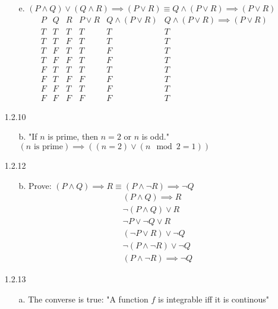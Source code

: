 \documentclass[11pt]{amsart}
\theoremstyle{definition}
\begin{document}
\begin{itemize}
\begin{itemize}
    \item[e.] $(P\land Q)\lor(Q\land R)\implies (P\lor R)\equiv
                Q\land(P\lor R)\implies (P\lor R)$
    \begin{equation*}
    \begin{array}{cccccc}
        P & Q & R & P\lor R & Q\land (P\lor R) & Q\land(P\lor R)\implies (P\lor R) \\
        T & T & T & T & T & T \\
        T & T & F & T & T & T \\
        T & F & T & T & F & T \\
        T & F & F & T & F & T \\
        F & T & T & T & T & T \\
        F & T & F & F & F & T \\
        F & F & T & T & F & T \\
        F & F & F & F & F & T
    \end{array}
    \end{equation*}  
    
\end{itemize}

\item[1.2.10]
\begin{itemize}
    \item[b.] "If $n$ is prime, then $n=2$ or $n$ is odd." \\
    $(n\text{ is prime})\implies((n=2)\lor (n\mod 2 = 1))$
    
\end{itemize}

\item[1.2.12]
\begin{itemize}
    \item[b.] Prove: $(P\land Q)\implies R\equiv
               (P\land \neg R)\implies \neg Q$
    \begin{align*}
        &(P\land Q)\implies R \\
        &\neg(P\land Q)\lor R \\
        &\neg P\lor \neg Q\lor R \\
        &(\neg P\lor R) \lor \neg Q \\
        &\neg(P\land \neg R)\lor \neg Q \\
        &(P\land \neg R)\implies \neg Q
    \end{align*}
    
\end{itemize}

\item[1.2.13]
\begin{itemize}
    \item[a.] The converse is true: "A function $f$ is integrable iff it is continous"


\end{itemize}
\end{itemize}
\end{document}
